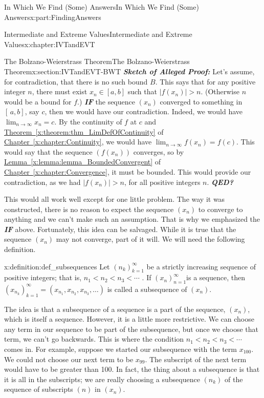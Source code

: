 \documentclass[oneside,10pt,]{book}
\newcommand{\xreffont}{\relax}
\newcommand{\alert}[1]{\textbf{\textit{#1}}}
\numberwithin{equation}{section}
\newcommand{\abs}[1]{\left|#1\right|}
\newcommand{\lt}{<}
\begin{document}
\begin{partptx}{In Which We Find (Some) Answers}{}{In Which We Find (Some) Answers}{}{}{x:part:FindingAnswers}
\begin{chapterptx}{Intermediate and Extreme Values}{}{Intermediate and Extreme Values}{}{}{x:chapter:IVTandEVT}
\begin{sectionptx}{The Bolzano-Weierstrass Theorem}{}{The Bolzano-Weierstrass Theorem}{}{}{x:section:IVTandEVT-BWT}
\alert{Sketch of Alleged Proof:} Let's assume, for contradiction, that there is no such bound \(B\). This says that for any positive integer \(n\), there must exist \(x_n\in[a,b]\) such that \(\abs{f(x_n)}>n\). (Otherwise \(n\) would be a bound for \(f\).) \alert{IF} the sequence \(\left(x_n\right)\) converged to something in \([\,a,b]\), say \(c\), then we would have our contradiction. Indeed, we would have \(\lim_{n\rightarrow\infty}x_n=c\). By the continuity of \(f\) at \(c\) and \hyperref[x:theorem:thm_LimDefOfContinuity]{Theorem~{\xreffont\ref{x:theorem:thm_LimDefOfContinuity}}} of \hyperref[x:chapter:Continuity]{Chapter~{\xreffont\ref{x:chapter:Continuity}}}, we would have \(\lim_{n\rightarrow\infty}f(x_n)=f(c)\). This would say that the sequence \(\left(f(x_n)\right)\) converges, so by \hyperref[x:lemma:lemma_BoundedConvergent]{Lemma~{\xreffont\ref{x:lemma:lemma_BoundedConvergent}}} of \hyperref[x:chapter:Convergence]{Chapter~{\xreffont\ref{x:chapter:Convergence}}}, it must be bounded. This would provide our contradiction, as we had \(|f(x_n)|>n\), for all positive integers \(n\). \alert{QED?}%
\par
This would all work well except for one little problem. The way it was constructed, there is no reason to expect the sequence \(\left(x_n\right)\) to converge to anything and we can't make such an assumption. That is why we emphasized the \alert{IF} above. Fortunately, this idea can be salvaged. While it is true that the sequence \(\left(x_n\right)\) may not converge, part of it will. We will need the following definition.%
\begin{definition}{}{x:definition:def_subsequences}%
 Let \(\left(n_k\right)_{k=1}^\infty\) be a strictly increasing sequence of positive integers; that is, \(n_1\lt n_2\lt n_3\lt \cdots\) . If \(\left(x_n\right)_{n=1}^\infty\)is a sequence, then \(\left(x_{n_k}\right)_{k=1}^\infty=\left(x_{n_1},x_{n_2},x_{n_3},\ldots \right)\) is called a \textbraceleft{}subsequence\textbraceright{} of \(\left(x_n\right)\).%
\end{definition}
The idea is that a subsequence of a sequence is a part of the sequence, \((x_n)\), which is itself a sequence. However, it is a little more restrictive. We can choose any term in our sequence to be part of the subsequence, but once we choose that term, we can't go backwards. This is where the condition \(n_1\lt n_2\lt n_3\lt \cdots\) comes in. For example, suppose we started our subsequence with the term \(x_{100}\). We could not choose our next term to be \(x_{99}\). The subscript of the next term would have to be greater than 100. In fact, the thing about a subsequence is that it is all in the subscripts; we are really choosing a subsequence \(\left(n_k\right)\) of the sequence of subscripts \(\left(n\right)\) in \(\left(x_n\right)\).%

\end{sectionptx}
\end{chapterptx}
\end{partptx}
\end{document}
